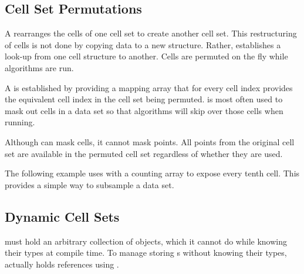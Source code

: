 

\subsection{Cell Set Permutations}


A  rearranges the cells of one cell set to
create another cell set. This restructuring of cells is not done by copying
data to a new structure. Rather, 
establishes a look-up from one cell structure to another. Cells are permuted
on the fly while algorithms are run.

A  is established by providing a mapping
array that for every cell index provides the equivalent cell index in the
cell set being permuted.  is most often
used to mask out cells in a data set so that algorithms will skip over
those cells when running.

\begin{didyouknow}
  Although  can mask cells, it cannot
  mask points. All points from the original cell set are available in the
  permuted cell set regardless of whether they are used.
\end{didyouknow}

The following example uses  with a counting
array to expose every tenth cell. This provides a simple way to subsample a
data set.



\subsection{Dynamic Cell Sets}


 must hold an arbitrary collection of 
objects, which it cannot do while knowing their types at compile time. To
manage storing s without knowing their types,
 actually holds references using
.

